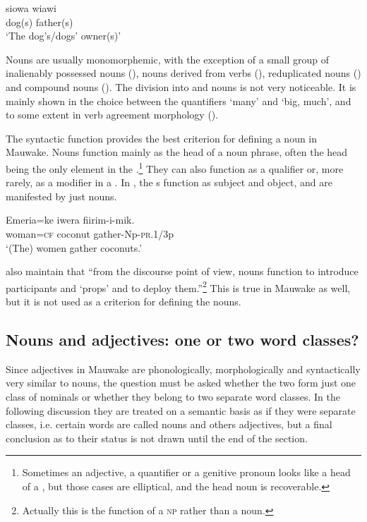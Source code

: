 \ea%
\label{ex:3:x1}
\gll siowa wiawi\\
dog(s) father(s)\\
\glt`The dog's/dogs' owner(s)'
\z

Nouns are usually monomorphemic, with the exception of a small group of inalienably possessed nouns (), nouns derived from verbs (), reduplicated nouns () and compound nouns (). The division into  and  nouns is not very noticeable. It is mainly shown in the choice between the quantifiers  `many' and  `big, much', and to some extent in verb agreement morphology ().

The syntactic function provides the best criterion for defining a noun in Mauwake. Nouns function mainly as the head of a noun phrase, often the head being the only element in the .\footnote{Sometimes an adjective, a quantifier or a genitive pronoun looks like a head of a , but those cases are elliptical, and the head noun is recoverable.} They can also function as a qualifier or, more rarely, as a modifier in a . In , the s function as subject and object, and are manifested by just nouns.

\ea%
\label{ex:3:x2}
\gll Emeria=ke iwera fiirim-i-mik.\\
 woman=\textsc{cf} coconut gather-Np-\textsc{pr}.1/3p\\
\glt`(The) women gather coconuts.'
\z

\citet[710]{HopperEtAl1984} also maintain that {``from the discourse point of view, nouns function to introduce participants and `props' and to deploy them.''}\footnote{Actually this is the function of a \textsc{np} rather than a noun.} This is true in Mauwake as well, but it is not used as a criterion for defining the nouns.

\subsection{Nouns and adjectives: one or two word classes?}\label{sec:3.2.2}
{}
Since adjectives in Mauwake are phonologically, morphologically and syntactically very similar to nouns, the question must be asked whether the two form just one class of nominals or whether they belong to two separate word classes. In the following discussion they are treated on a semantic basis as if they were separate classes, i.e. certain words are called nouns and others adjectives, but a final conclusion as to their status is not drawn until the end of the section.


